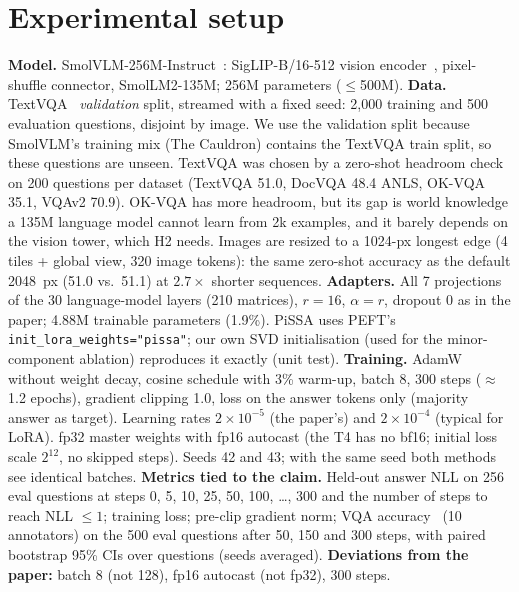 \documentclass[10pt,a4paper]{article}
\begin{document}
\section{Experimental setup}
\textbf{Model.} SmolVLM-256M-Instruct~\cite{smolvlm}: SigLIP-B/16-512 vision encoder~\cite{siglip}, pixel-shuffle connector, SmolLM2-135M; 256M parameters ($\le$500M).
\textbf{Data.} TextVQA~\cite{textvqa} \emph{validation} split, streamed with a fixed seed: 2{,}000 training and 500 evaluation questions, disjoint by image. We use the validation split because SmolVLM's training mix (The Cauldron) contains the TextVQA train split, so these questions are unseen. TextVQA was chosen by a zero-shot headroom check on 200 questions per dataset (TextVQA 51.0, DocVQA 48.4 ANLS, OK-VQA 35.1, VQAv2 70.9). OK-VQA has more headroom, but its gap is world knowledge a 135M language model cannot learn from 2k examples, and it barely depends on the vision tower, which H2 needs. Images are resized to a 1024-px longest edge (4 tiles + global view, 320 image tokens): the same zero-shot accuracy as the default 2048~px (51.0 vs.\ 51.1) at $2.7\times$ shorter sequences.
\textbf{Adapters.} All 7 projections of the 30 language-model layers (210 matrices), $r=16$, $\alpha=r$, dropout 0 as in the paper; 4.88M trainable parameters (1.9\%). PiSSA uses PEFT's \texttt{init\_lora\_weights="pissa"}; our own SVD initialisation (used for the minor-component ablation) reproduces it exactly (unit test).
\textbf{Training.} AdamW without weight decay, cosine schedule with 3\% warm-up, batch 8, 300 steps ($\approx$1.2 epochs), gradient clipping 1.0, loss on the answer tokens only (majority answer as target). Learning rates $2\!\times\!10^{-5}$ (the paper's) and $2\!\times\!10^{-4}$ (typical for LoRA). fp32 master weights with fp16 autocast (the T4 has no bf16; initial loss scale $2^{12}$, no skipped steps). Seeds 42 and 43; with the same seed both methods see identical batches.
\textbf{Metrics tied to the claim.} Held-out answer NLL on 256 eval questions at steps 0, 5, 10, 25, 50, 100, \dots, 300 and the number of steps to reach NLL $\le 1$; training loss; pre-clip gradient norm; VQA accuracy~\cite{vqa} (10 annotators) on the 500 eval questions after 50, 150 and 300 steps, with paired bootstrap 95\% CIs over questions (seeds averaged).
\textbf{Deviations from the paper:} batch 8 (not 128), fp16 autocast (not fp32), 300 steps.
\end{document}
